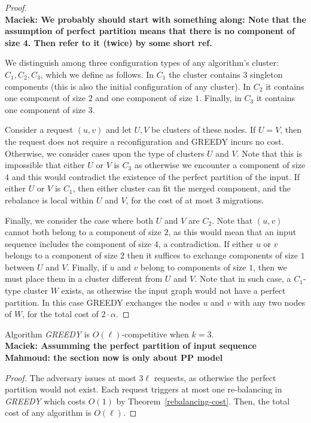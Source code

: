 \documentclass[manuscript,screen=true]{acmart}
\newcommand\mahmoud[1]{\color{green}\textbf{\\ Mahmoud: #1}\\\color{black}}
\newcommand\maciek[1]{\color{brown}\textbf{\\ Maciek: #1}\color{black}}
\begin{document}
\begin{appendix}
\begin{proof}
    \maciek{We probably should start with something along: Note that the assumption of perfect partition means that there is no component of size 4. Then refer to it (twice) by some short ref.}
    
    We distinguish among three configuration types of any algorithm's cluster: $C_1, C_2, C_3$, which we define as follows. In $C_1$ the cluster contains $3$ singleton components (this is also the initial configuration of any cluster). In $C_2$ it contains one component of size $2$ and one component of size $1$. Finally, in $C_3$ it contains one component of size $3$.
  
    Consider a request $(u, v)$ and let $U, V$ be clusters of these nodes.
    If $U=V$, then the request does not require a reconfiguration and GREEDY incurs no cost.
    Otherwise, we consider cases upon the type of clusters $U$ and $V$.
    Note that this is impossible that either $U$ or $V$ is $C_3$ as otherwise we encounter a component of size $4$ and this would contradict the existence of the perfect partition of the input.
    If either $U$ or $V$ is $C_1$, then either cluster can fit the merged component, and the rebalance is local within $U$ and $V$, for the cost of at most $3$ migrations.
  
    Finally, we consider the case where both $U$ and $V$ are $C_2$. Note that $(u,v)$ cannot both belong to a component of size $2$, as this would mean that an input sequence includes the component of size $4$, a contradiction. 
    If either $u$ or $v$ belongs to a component of size $2$ then it suffices to exchange components of size $1$ between $U$ and $V$.
    Finally, if $u$ and $v$ belong to components of size $1$, then we must place them in a cluster different from $U$ and $V$.
    Note that in such case, a $C_1$-type cluster $W$ exists, as otherwise the input graph would not have a perfect partition. In this case GREEDY exchanges the nodes $u$ and $v$ with any two nodes of $W$, for the total cost of $2\cdot \alpha$.
  \end{proof}
  
    
  \begin{theorem}
    Algorithm \emph{GREEDY} is $O(\ell)$-competitive when $k=3$.
    \maciek{Assumming the perfect partition of input sequence
    \mahmoud{the section now is only about PP model}}
  \end{theorem}
  
  \begin{proof}
    The adversary issues at most $3\ell$ requests, as otherwise the perfect partition would not exist.
    Each request triggers at most one re-balancing in \emph{GREEDY}
    which costs $O(1)$ by Theorem~\ref{rebalancing-cost}.
    Then,
    the total cost of any algorithm is $O(\ell)$.
  \end{proof}
  

\end{appendix}
\end{document}
